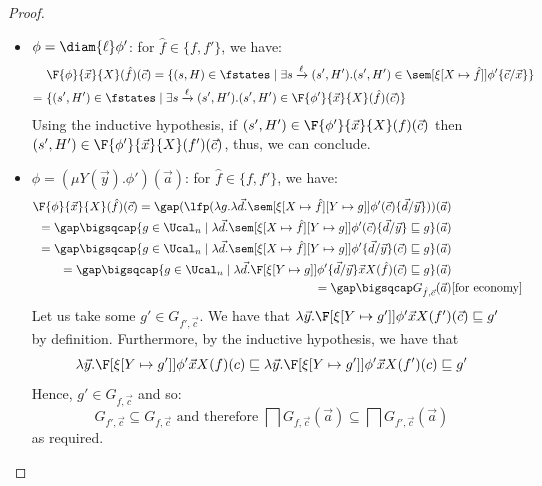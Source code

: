 \begin{proof}
\begin{itemize}
		\item $\phi = \diam{\ell} \phi'$: for $\hat f \in \{f,f'\}$, we have:
		\begin{align*}
		&\F{\phi}{\vec x}{X}(\hat f)(\vec c) = \{(s, H) \in \fstates \mid \exists s\xrightarrow{\ell}(s', H').(s', H')\in \sem[{\xi[X\mapsto \hat f]}]{\phi'\{\vec c / \vec x\}} \} 
		\\=\ & \{(s', H') \in \fstates \mid \exists s\xrightarrow{\ell}(s', H').(s', H') \in \F{\phi'}{\vec x}{X}(\hat f)(\vec c)\}
		\end{align*}
		Using the inductive hypothesis, if $(s', H')\in \F{\phi'}{\vec x}{X}(f)(\vec c)$ then $(s', H')\in \F{\phi'}{\vec x}{X}(f')(\vec c)$,
		thus, we can conclude.
		\item $\phi = (\mu Y(\vec y).\phi')(\vec a)$: for $\hat f \in \{f,f'\}$, we have:
    	\begin{align*}
			\F{\phi}{\vec x}{X}(\hat f)(\vec c) =\gap (\lfp(\lambda g. \lambda \vec d.\sem[{\xi[X\mapsto \hat f][Y\mapsto g]}]{\phi'(\vec c)\{\vec d/\vec y\}}))(\vec a) \\
			=\gap \bigsqcap \{g\in \Ucal_n\mid 
			\lambda \vec d. \sem[{\xi[X\mapsto \hat f][Y\mapsto g]}]{\phi'(\vec c)\{\vec d/\vec y\}}\sqsubseteq g\}(\vec a)\\
			=\gap\bigsqcap \{g\in \Ucal_n\mid 
			\lambda \vec d. \sem[{\xi[X\mapsto \hat f][Y\mapsto g]}]{\phi'\{\vec d/\vec y\}(\vec c)}\sqsubseteq g\}(\vec a)\\
			=\gap \bigsqcap\{g \in \Ucal_n\mid \lambda \vec d.\F[{\xi[Y\mapsto g]}]{\phi'\{\vec d/\vec y\}}{\vec x}{X}(\hat f)(\vec c) \sqsubseteq g\}(\vec a)\\
			=\gap \bigsqcap G_{\hat f, \vec c}(\vec a) &[\text{for economy}]
		\end{align*}
		Let us take some $ g' \in G_{f', \vec c}$.
		We have that $\lambda \vec y.\F[{\xi[Y\mapsto g']}]{\phi'}{\vec x}{X}(f')(\vec c) \sqsubseteq g'$ by definition.
		Furthermore, by the inductive hypothesis,
		we have that 
		$$\lambda \vec y.\F[{\xi[Y\mapsto g']}]{\phi'}{\vec x}{X}(f)(c)\sqsubseteq\lambda \vec y.\F[{\xi[Y\mapsto g']}]{\phi'}{\vec x}{X}(f')(c) \sqsubseteq g'$$
		Hence, $g' \in G_{f, \vec c}$ and so: 
		\[
			G_{f', \vec c} \subseteq G_{f, \vec c} \text{ and therefore } \bigsqcap G_{f, \vec c} (\vec a) \subseteq \bigsqcap G_{f', \vec c} (\vec a)
		\]
		as required.
	\end{itemize}

		
\end{proof}
	
